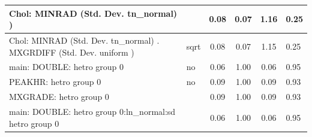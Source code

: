 \begin{table}
\begin{center}
\begin{tabular}{|l|l|c|c|c|l|}
			\hline
			 Chol: MINRAD (Std. Dev. tn_normal) ) &  & 0.08 & 0.07 & 1.16 & 0.25 \\
			\hline
			 Chol: MINRAD (Std. Dev. tn_normal) . MXGRDIFF (Std. Dev.   uniform ) & sqrt & 0.08 & 0.07 & 1.15 & 0.25 \\
			\hline
			main: DOUBLE: hetro group 0 & no & 0.06 & 1.00 & 0.06 & 0.95 \\
			\hline
			PEAKHR: hetro group 0 & no & 0.09 & 1.00 & 0.09 & 0.93 \\
			\hline
			MXGRADE: hetro group 0 &  & 0.09 & 1.00 & 0.09 & 0.93 \\
			\hline
			main: DOUBLE: hetro group 0:ln_normal:sd  hetro group 0 &  & 0.06 & 1.00 & 0.06 & 0.95 \\
			\hline
		\end{tabular}
	\end{center}
\end{table}